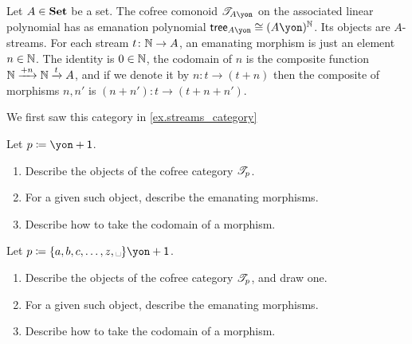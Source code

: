 \documentclass[Book-Poly]{subfiles}
\begin{document}
\begin{example}\label{ex.streams_cofree}
Let $A\in\mathbf{Set}$ be a set. The cofree comonoid $\cofree{A\yon}$ on the associated linear polynomial has as emanation polynomial $\tr_{A\yon}\cong (A\yon)^\nn$. Its objects are $A$-streams. For each stream $t\colon \mathbb{N}\to A$, an emanating morphism is just an element $n\in\mathbb{N}$. The identity is $0\in\mathbb{N}$, the codomain of $n$ is the composite function $\mathbb{N}\xrightarrow{+n}\mathbb{N}\xrightarrow{t}A$, and if we denote it by $n\colon t\to (t+n)$ then the composite of morphisms $n,n'$ is $(n+n')\colon t\to (t+n+n')$.

We first saw this category in \cref{ex.streams_category}
\end{example}

\begin{exercise}
Let $p\coloneqq \yon+\1$.
\begin{enumerate}
	\item Describe the objects of the cofree category $\mathscr{T}_{p}$.
	\item For a given such object, describe the emanating morphisms.
	\item Describe how to take the codomain of a morphism.
\qedhere
\end{enumerate}
\end{exercise}

\begin{exercise}
Let $p\coloneqq \{a,b,c,\ldots,z,\text{\textvisiblespace}\}\yon+\1$.
\begin{enumerate}
	\item Describe the objects of the cofree category $\mathscr{T}_{p}$, and draw one.
	\item For a given such object, describe the emanating morphisms.
	\item Describe how to take the codomain of a morphism.
\qedhere
\end{enumerate}
\end{exercise}
\end{document}
